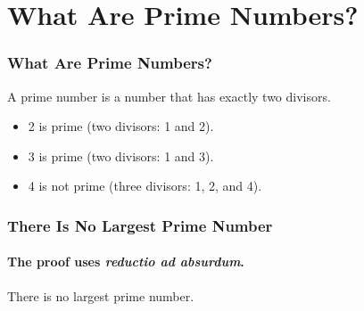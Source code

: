 %
%
%
%

\section{What Are Prime Numbers?}

\begin{frame}
\frametitle{What Are Prime Numbers?}
\begin{definition}
A \alert{prime number} is a number that has exactly two divisors.
\end{definition}
\end{frame}


\begin{frame}
\begin{example}
\begin{itemize}
\item 2 is prime (two divisors: 1 and 2).
  \pause
\item 3 is prime (two divisors: 1 and 3).
  \pause
\item 4 is not prime (\alert{three} divisors: 1, 2, and 4).
\end{itemize}
\end{example}
\end{frame}

\begin{frame}
\frametitle{There Is No Largest Prime Number}
\framesubtitle{The proof uses \textit{reductio ad absurdum}.}
\begin{theorem}
There is no largest prime number.
\end{theorem}
\end{frame}

